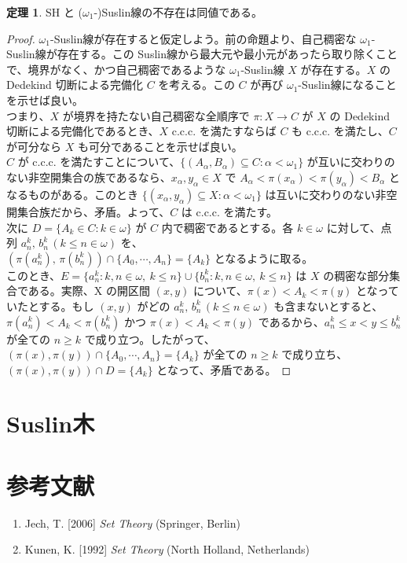 \documentclass{jsarticle}
\theoremstyle{definition}
\newtheorem{theorem}{定理}[section]
\begin{document}
    \begin{theorem}
        SH と ($\omega_1$-)Suslin線の不存在は同値である。
    \end{theorem}
    \begin{proof}
        $\omega_1$-Suslin線が存在すると仮定しよう。前の命題より、自己稠密な $\omega_1$-Suslin線が存在する。この Suslin線から最大元や最小元があったら取り除くことで、境界がなく、かつ自己稠密であるような $\omega_1$-Suslin線 $X$ が存在する。$X$ の Dedekind 切断による完備化 $C$ を考える。この $C$ が再び $\omega_1$-Suslin線になることを示せば良い。\\
        つまり、$X$ が境界を持たない自己稠密な全順序で $\pi : X \rightarrow C$ が $X$ の Dedekind 切断による完備化であるとき、$X$ c.c.c. を満たすならば $C$ も c.c.c. を満たし、$C$ が可分なら $X$ も可分であることを示せば良い。\\
        $C$ が c.c.c. を満たすことについて、$\{(A_\alpha, B_\alpha) \subseteq C : \alpha < \omega_1\}$ が互いに交わりのない非空開集合の族であるなら、$x_\alpha, y_\alpha \in X$ で $A_\alpha < \pi(x_\alpha) < \pi(y_\alpha) < B_\alpha$ となるものがある。このとき $\{(x_\alpha, y_\alpha) \subseteq X : \alpha < \omega_1\}$ は互いに交わりのない非空開集合族だから、矛盾。よって、$C$ は c.c.c. を満たす。\\
        次に $D = \{A_k \in C : k \in \omega\}$ が $C$ 内で稠密であるとする。各 $k \in \omega$ に対して、点列 $a^k_n, \, b^k_n \, (k \leq n \in \omega)$ を、\\
        $(\pi(a^k_n), \, \pi(b^k_n)) \cap \{A_0, \cdots, A_n\} = \{A_k\}$ となるように取る。\\
        このとき、$E = \{a^k_n : k,n\in\omega, \ k \leq n\} \cup \{b^k_n : k,n\in\omega, \ k \leq n\}$ は $X$ の稠密な部分集合である。実際、X の開区間 $(x, y)$ について、$\pi(x) < A_k < \pi(y)$ となっていたとする。もし $(x, y)$ がどの $a^k_n, \, b^k_n \, (k \leq n \in \omega)$ も含まないとすると、$\pi(a^k_n) < A_k < \pi(b^k_n)$ かつ $\pi(x) < A_k < \pi(y)$ であるから、$a^k_n \leq x < y \leq b^k_n$ が全ての $n \geq k$ で成り立つ。したがって、$(\pi(x), \pi(y)) \cap \{ A_0, \cdots, A_n\} = \{A_k\}$ が全ての $n \geq k$ で成り立ち、$(\pi(x), \pi(y)) \cap D = \{A_k\}$ となって、矛盾である。
    \end{proof}
    
    \newpage
    \section{Suslin木}
    
    \section{参考文献}
    \begin{enumerate}[]
        \item Jech, T. [2006] {\it Set Theory} (Springer, Berlin)
        \item Kunen, K. [1992] {\it Set Theory} (North Holland, Netherlands)
    \end{enumerate}
\end{document}
